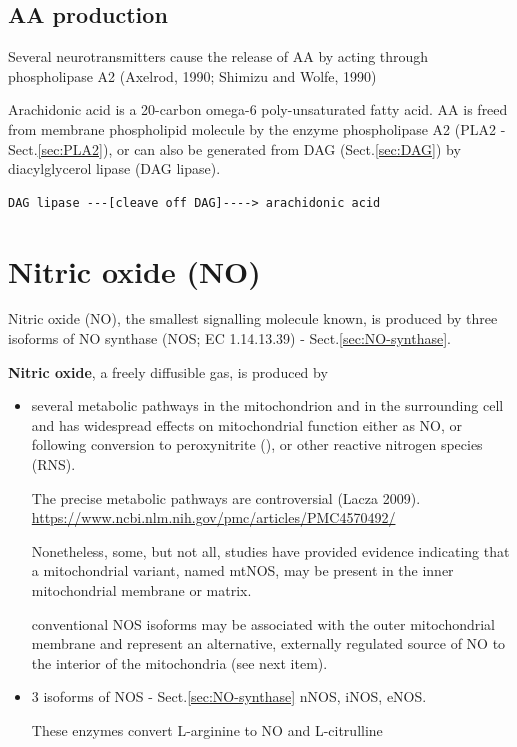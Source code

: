 \subsection{AA production}
\label{sec:AA-production}
\label{sec:arachidonic-acids-production}

Several neurotransmitters cause the release of AA by acting through
phospholipase A2 (Axelrod, 1990; Shimizu and Wolfe, 1990)

Arachidonic acid is a 20-carbon omega-6 poly-unsaturated fatty acid.
AA is freed from membrane phospholipid molecule by the enzyme
phospholipase A2 (PLA2 - Sect.\ref{sec:PLA2}), or can also be generated from DAG
(Sect.\ref{sec:DAG}) by diacylglycerol lipase (DAG lipase).
\begin{verbatim}
DAG lipase ---[cleave off DAG]----> arachidonic acid 
\end{verbatim}



\section{Nitric oxide (NO)}
\label{sec:nitric-oxide}

Nitric oxide (NO), the smallest signalling molecule known, is produced by three
isoforms of NO synthase (NOS; EC 1.14.13.39) - Sect.\ref{sec:NO-synthase}.

{\bf Nitric oxide}, a freely diffusible gas, is produced by
\begin{itemize}
  \item  several metabolic pathways in the mitochondrion and in the surrounding
  cell and has widespread effects on mitochondrial function either as NO,  or
  following conversion to peroxynitrite (), or other reactive
  nitrogen species (RNS). 
  
  The precise metabolic pathways are controversial (Lacza 2009). 
\url{https://www.ncbi.nlm.nih.gov/pmc/articles/PMC4570492/}

Nonetheless, some, but not all, studies have provided evidence indicating that a
mitochondrial variant, named mtNOS, may be present in the inner mitochondrial
membrane or matrix.  

conventional NOS isoforms may be associated with the outer mitochondrial
membrane and represent an alternative, externally regulated source of NO to the
interior of the mitochondria (see next item). 

  \item 3 isoforms of NOS - Sect.\ref{sec:NO-synthase} nNOS, iNOS, eNOS.
  
  These enzymes convert L-arginine to NO and L-citrulline
  
\end{itemize}

